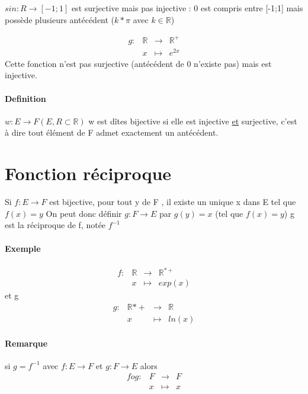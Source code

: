 $sin : R \rightarrow [-1;1]$ est surjective mais pas injective : 0 est compris entre [-1;1] mais possède plusieurs antécédent ($k*\pi$ avec $k\in\mathbb{R}$)


\[\begin{array}{rccl}
	g : & \mathbb{R} & \rightarrow & \mathbb{R}^+ \\
   & x & \mapsto & e^{2x}
\end{array}\]
Cette fonction n'est pas surjective (antécédent de 0 n'existe pas) mais est injective.

\paragraph{Definition} $w : E \rightarrow F (E,R \subset \mathbb{R})$
w est dîtes bijective si elle est injective \ul{et} surjective, c'est à dire tout élément de F admet exactement  un antécédent.

\section{Fonction réciproque}
Si $f:E\rightarrow F$ est bijective, pour tout y de F , il existe un unique x dans E tel que $f(x) = y$
On peut donc définir $g:F\rightarrow E$ par $g(y) = x$ (tel que $f(x)=y$)
g est la réciproque de f, notée $f^{-1}$

\paragraph{Exemple}
\[\begin{array}{rccl}
	f: & \mathbb{R} & \rightarrow & \mathbb{R}^{*+} \\
	   & x & \mapsto & exp(x)
\end{array}\]
 et g 
 \[\begin{array}{rccl}
	g: & \mathbb{R}{*+} & \rightarrow & \mathbb{R} \\
	   & x & \mapsto & ln(x)
 \end{array}\]

\paragraph{Remarque} si $g=f^{-1}$ avec $f: E \rightarrow F$ et $g: F \rightarrow E$ alors
\[\begin{array}{rccl}
	fog: & F & \rightarrow & F \\
	   & x & \mapsto & x
\end{array}\]


